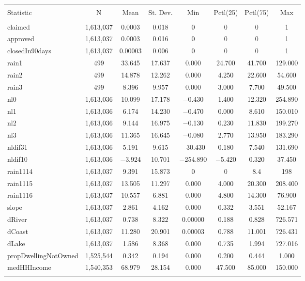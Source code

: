 \documentclass{article}
\begin{document}
\begin{table}[!htbp] \centering 
\caption{} 
\label{} 
\begin{tabular}{@{\extracolsep{5pt}}lccccccc} 
\\[-1.8ex]\hline 
\hline \\[-1.8ex] 
Statistic & \multicolumn{1}{c}{N} & \multicolumn{1}{c}{Mean} & \multicolumn{1}{c}{St. Dev.} & \multicolumn{1}{c}{Min} & \multicolumn{1}{c}{Pctl(25)} & \multicolumn{1}{c}{Pctl(75)} & \multicolumn{1}{c}{Max} \\ 
\hline \\[-1.8ex] 
claimed & 1,613,037 & 0.0003 & 0.018 & 0 & 0 & 0 & 1 \\ 
approved & 1,613,037 & 0.0003 & 0.016 & 0 & 0 & 0 & 1 \\ 
closedIn90days & 1,613,037 & 0.00003 & 0.006 & 0 & 0 & 0 & 1 \\ 
rain1 & 499 & 33.645 & 17.637 & 0.000 & 24.700 & 41.700 & 129.000 \\ 
rain2 & 499 & 14.878 & 12.262 & 0.000 & 4.250 & 22.600 & 54.600 \\ 
rain3 & 499 & 8.396 & 9.957 & 0.000 & 3.000 & 7.700 & 49.500 \\ 
nl0 & 1,613,036 & 10.099 & 17.178 & $-$0.430 & 1.400 & 12.320 & 254.890 \\ 
nl1 & 1,613,036 & 6.174 & 14.230 & $-$0.470 & 0.000 & 8.610 & 150.010 \\ 
nl2 & 1,613,036 & 9.144 & 16.975 & $-$0.130 & 0.230 & 11.830 & 199.270 \\ 
nl3 & 1,613,036 & 11.365 & 16.645 & $-$0.080 & 2.770 & 13.950 & 183.290 \\ 
nldif31 & 1,613,036 & 5.191 & 9.615 & $-$30.430 & 0.180 & 7.540 & 131.690 \\ 
nldif10 & 1,613,036 & $-$3.924 & 10.701 & $-$254.890 & $-$5.420 & 0.320 & 37.450 \\ 
rain1114 & 1,613,037 & 9.391 & 15.873 & 0 & 0 & 8.4 & 198 \\ 
rain1115 & 1,613,037 & 13.505 & 11.297 & 0.000 & 4.000 & 20.300 & 208.400 \\ 
rain1116 & 1,613,037 & 10.557 & 6.881 & 0.000 & 4.800 & 14.300 & 76.900 \\ 
slope & 1,613,037 & 2.861 & 4.162 & 0.000 & 0.332 & 3.551 & 52.167 \\ 
dRiver & 1,613,037 & 0.738 & 8.322 & 0.00000 & 0.188 & 0.828 & 726.571 \\ 
dCoast & 1,613,037 & 11.280 & 20.901 & 0.00003 & 0.788 & 11.001 & 726.431 \\ 
dLake & 1,613,037 & 1.586 & 8.368 & 0.000 & 0.735 & 1.994 & 727.016 \\ 
propDwellingNotOwned & 1,525,544 & 0.342 & 0.194 & 0.000 & 0.200 & 0.444 & 1.000 \\ 
medHHIncome & 1,540,353 & 68.979 & 28.154 & 0.000 & 47.500 & 85.000 & 150.000 \\ 
\hline \\[-1.8ex] 
\end{tabular} 
\end{table} 
\end{document}

